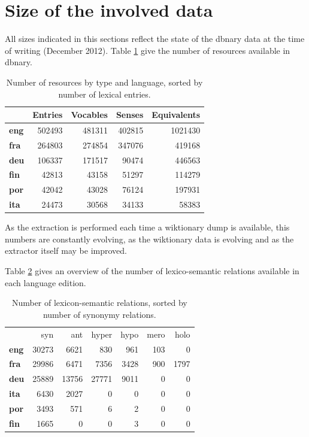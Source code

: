 \documentclass[sw]{iosart2c}
\begin{document}
\section{Size of the involved data}

All sizes indicated in this sections reflect the state of the dbnary data at the time of writing (December 2012). Table \ref{globalsize} give the number of resources available in dbnary.

\begin{table}[htb]
\begin{tabular}{lrrrr}
 & \textbf{Entries} & \textbf{Vocables} & \textbf{Senses} & \textbf{Equivalents}\\
 \hline
\textbf{eng} & 502493 & 481311 & 402815 & 1021430 \\
\textbf{fra} & 264803 & 274854 & 347076 & 419168 \\
\textbf{deu} & 106337 & 171517 & 90474 & 446563 \\
\textbf{fin} & 42813  & 43158 & 51297 & 114279 \\
\textbf{por} & 42042  & 43028 & 76124 & 197931 \\
\textbf{ita} & 24473  & 30568 & 34133 & 58383 \\
\end{tabular}
\caption{Number of resources by type and language, sorted by number of lexical entries.}\label{globalsize}
\end{table}

As the extraction is performed each time a wiktionary dump is available, this numbers are constantly evolving, as the wiktionary data is evolving and as the extractor itself may be improved.


Table \ref{nymsize} gives an overview of the number of lexico-semantic relations available in each language edition.

\begin{table}[htb]
\begin{tabular}{lrrrrrr}
 & syn  & ant & hyper & hypo & mero & holo \\
\textbf{eng} & 30273& 6621& 830& 961& 103& 0 \\ 
\textbf{fra} & 29986& 6471& 7356& 3428& 900& 1797 \\ 
\textbf{deu} & 25889& 13756& 27771& 9011& 0& 0 \\ 
\textbf{ita} & 6430&  2027& 0& 0& 0& 0 \\ 
\textbf{por} & 3493&  571& 6& 2& 0& 0 \\ 
\textbf{fin} & 1665&  0& 0& 3& 0& 0 \\ 
\end{tabular}
\caption{Number of lexicon-semantic relations, sorted by number of synonymy relations.}\label{nymsize}
\end{table}
\end{document}
